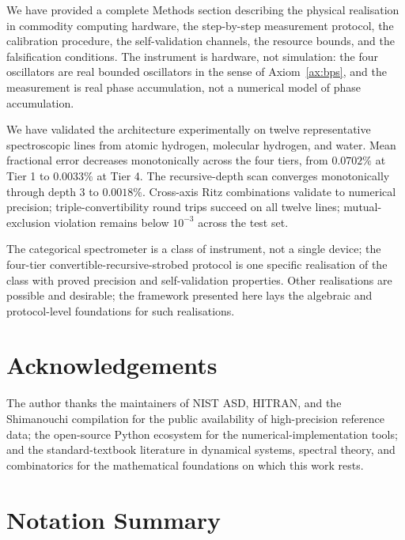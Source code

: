 \documentclass[twocolumn,11pt,a4paper]{article}
\theoremstyle{thmstyle}
\theoremstyle{axiomstyle}
\theoremstyle{definition}
\theoremstyle{remark}
\begin{document}
We have provided a complete Methods section describing the physical realisation in commodity computing hardware, the step-by-step measurement protocol, the calibration procedure, the self-validation channels, the resource bounds, and the falsification conditions. The instrument is hardware, not simulation: the four oscillators are real bounded oscillators in the sense of Axiom~\ref{ax:bps}, and the measurement is real phase accumulation, not a numerical model of phase accumulation.

We have validated the architecture experimentally on twelve representative spectroscopic lines from atomic hydrogen, molecular hydrogen, and water. Mean fractional error decreases monotonically across the four tiers, from $0.0702\%$ at Tier 1 to $0.0033\%$ at Tier 4. The recursive-depth scan converges monotonically through depth 3 to $0.0018\%$. Cross-axis Ritz combinations validate to numerical precision; triple-convertibility round trips succeed on all twelve lines; mutual-exclusion violation remains below $10^{-3}$ across the test set.

The categorical spectrometer is a class of instrument, not a single device; the four-tier convertible-recursive-strobed protocol is one specific realisation of the class with proved precision and self-validation properties. Other realisations are possible and desirable; the framework presented here lays the algebraic and protocol-level foundations for such realisations.

\section*{Acknowledgements}

The author thanks the maintainers of NIST ASD, HITRAN, and the Shimanouchi compilation for the public availability of high-precision reference data; the open-source Python ecosystem for the numerical-implementation tools; and the standard-textbook literature in dynamical systems, spectral theory, and combinatorics for the mathematical foundations on which this work rests.

\clearpage

\appendix

\section{Notation Summary}
\label{app:notation}
\end{document}
